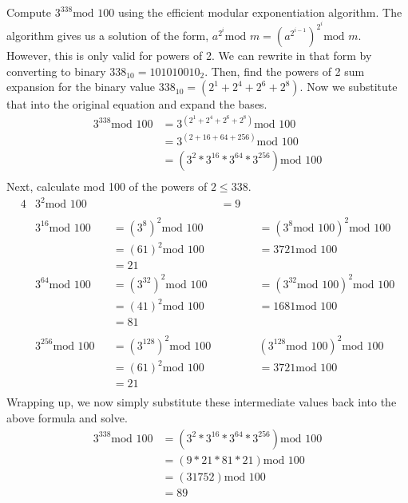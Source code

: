 \documentclass[11pt]{article}
\begin{document}
\subsection{} %
Compute $3^{338} \text{mod } 100$ using the efficient modular exponentiation algorithm. The algorithm gives us a solution of the form, $a^{2^{i}} \text{mod } m = (a^{2^{i-1}})^{2^{i}} \text{mod } m$. However, this is only valid for powers of 2. We can rewrite in that form by converting to binary $338_{10} = 101010010_{2}$. Then, find the powers of 2 sum expansion for the binary value $338_{10} = (2^1 + 2^4 + 2^6 + 2^8)$. Now we substitute that into the original equation and expand the bases. 
\begin{align*}
	3^{338} \text{mod } 100 &= 3^{(2^1 + 2^4 + 2^6 + 2^8)} \text{mod } 100 \\
	&= 3^{(2 + 16 + 64 + 256)} \text{mod } 100 \\
	&=  (3^{2} * 3^{16} * 3^{64} * 3^{256}) \text{mod } 100 \\
\end{align*}
Next, calculate mod 100 of the powers of $2 \leq 338$. 
\begin{alignat*}{4}
	& 3^2 \text{mod } 100
	& &&= 9\\ 
	\\
	& 3^{16} \text{mod } 100 &&= (3^8)^2 \text{mod } 100 &&&= (3^8 \text{mod } 100)^2 \text{mod } 100 \\
	& &&= (61)^2 \text{mod } 100 &&&= 3721 \text{mod } 100 \\
	& &&=  21
	\\
	& 3^{64} \text{mod } 100 &&= (3^{32})^2 \text{mod } 100 &&&= (3^{32}\text{mod }100)^2 \text{mod } 100 \\
	& &&= (41)^2 \text{mod } 100  &&&= 1681 \text{mod } 100 \\
	& &&= 81 \\
	\\
	& 3^{256} \text{mod } 100 &&= (3^{128})^2 \text{mod } 100 &&& (3^{128}\text{mod } 100)^2 \text{mod } 100 \\
	& &&= (61)^2 \text{mod } 100 &&&= 3721 \text{mod } 100 \\
	& &&=  21 \\
\end{alignat*}
Wrapping up, we now simply substitute these intermediate values back into the above formula and solve. 
\begin{align*}
	3^{338} \text{mod } 100 &= (3^{2} * 3^{16} * 3^{64} * 3^{256}) \text{mod } 100 \\
	&= (9 * 21 * 81 * 21) \text{mod } 100 \\
	&= (31752) \text{mod } 100 \\
	&= 89 \\
\end{align*}
\end{document}

